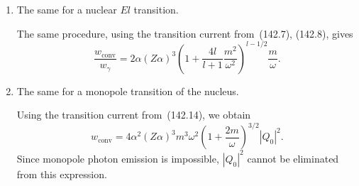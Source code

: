 \begin{enumerate}
For an $Ml$ transition, $J_{fi}$ must be taken from~(142.9). Integration of $dw_{\text{conv}}$ over~$d\varepsilon'$ removes the $\delta$~function, while integration over~$do'$ turns $|\mathbf Y_{lm}^{(\mathrm m)}|^2$ into~1. The conversion probability is consequently expressed through $|Q_{l,-m}^{(\mathrm m)}|^2$. According to~(46.9), however, the probability $w_\gamma$ of spontaneous photon emission in the same nuclear transition is expressed through this same quantity. The final result is
\[
\frac{w_{\text{conv}}}{w_\gamma}
=2\alpha(Z\alpha)^3\frac{m}{\omega}
\left(1+\frac{2m}{\omega}\right)^{l+1/2}
\]
(this ratio is called the \emph{conversion coefficient}).

\item The same for a nuclear $El$ transition.

\SolutionHeading The same procedure, using the transition current from~(142.7), (142.8), gives
\[
\frac{w_{\text{conv}}}{w_\gamma}
=2\alpha(Z\alpha)^3
\left(1+\frac{4l}{l+1}\frac{m^2}{\omega^2}\right)^{l-1/2}
\frac{m}{\omega}.
\]

\item The same for a monopole transition of the nucleus.

\SolutionHeading Using the transition current from~(142.14), we obtain
\[
w_{\text{conv}}=4\alpha^2(Z\alpha)^3m^3\omega^2
\left(1+\frac{2m}{\omega}\right)^{3/2}|Q_0|^2.
\]
Since monopole photon emission is impossible, $|Q_0|^2$ cannot be eliminated from this expression.
\end{enumerate}
